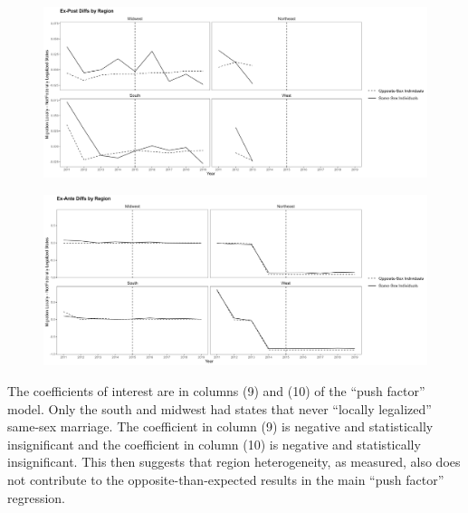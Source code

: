 \documentclass[12pt,letterpaper]{article}
\begin{document}
\begin{centering}
\begin{figure}
    \includegraphics[width=1\linewidth]{outputs/summary_stats/region_post_diffs.png}
    \caption{}
    \label{fig: region_post_diffs}
\end{figure}

\begin{figure}
    \includegraphics[width=1\linewidth]{outputs/summary_stats/region_ante_diffs.png}
    \caption{}
    \label{fig: region_ante_diffs}
\end{figure}
\end{centering}

The coefficients of interest are in columns (9) and (10) of the “push factor” model. Only the south and midwest had states that never “locally legalized” same-sex marriage. The coefficient in column (9) is negative and statistically insignificant and the coefficient in column (10) is negative and statistically insignificant. This then suggests that region heterogeneity, as measured, also does not contribute to the opposite-than-expected results in the main “push factor” regression. 


\begin{landscape}
\begin{tiny}
\begin{table}[h] %
    \centering
    
    \caption{}
    \label{tab: region_expost_model}
\end{table}
\begin{table}[h]
    \centering
    
    \caption{}
    \label{tab: region_exante_model}
\end{table}
\end{tiny}
\end{landscape}
\end{document}
